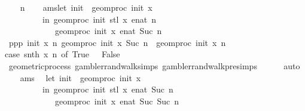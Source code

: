 \begin{isabellebody}
\isanewline
\ \ \isamarkupfalse%
\ n\isanewline
\ \ \isamarkupfalse%
\ ams{\isacharcolon}{\kern0pt}{\isachardoublequoteopen}let\ init{\isacharprime}{\kern0pt}\ {\isacharequal}{\kern0pt}\ geom{\isacharunderscore}{\kern0pt}proc\ init\ x\ {}\isanewline
\ \ \ \ \ \ \ \ \ in\ geom{\isacharunderscore}{\kern0pt}proc\ init{\isacharprime}{\kern0pt}\ {\isacharparenleft}{\kern0pt}stl\ x{\isacharparenright}{\kern0pt}\ {\isacharparenleft}{\kern0pt}enat\ n{\isacharparenright}{\kern0pt}\ {\isacharequal}{\kern0pt}\isanewline
\ \ \ \ \ \ \ \ \ \ \ \ geom{\isacharunderscore}{\kern0pt}proc\ init\ x\ {\isacharparenleft}{\kern0pt}enat\ {\isacharparenleft}{\kern0pt}Suc\ n{\isacharparenright}{\kern0pt}{\isacharparenright}{\kern0pt}{\isachardoublequoteclose}\isanewline
\ \ \isamarkupfalse%
\ ppp{}{\isacharcolon}{\kern0pt}{\isachardoublequoteopen}{\isasymAnd}\ init{}\ x{}\ n{\isachardot}{\kern0pt}\ geom{\isacharunderscore}{\kern0pt}proc\ init{}\ x{}\ {\isacharparenleft}{\kern0pt}Suc\ n{\isacharparenright}{\kern0pt}\ {\isacharequal}{\kern0pt}\ geom{\isacharunderscore}{\kern0pt}proc\ init{}\ x{}\ n\ {\isacharplus}{\kern0pt}\ \isanewline
{\isacharparenleft}{\kern0pt}case\ snth\ x{}\ n\ of\ True\ {\isasymRightarrow}\ {}{\isacharbar}{\kern0pt}\ False\ {\isasymRightarrow}\ {\isacharminus}{\kern0pt}{}{\isacharparenright}{\kern0pt}{\isachardoublequoteclose}\isanewline
\ \ \ \ \isamarkupfalse%
\ geometric{\isacharunderscore}{\kern0pt}process\ gambler{\isacharunderscore}{\kern0pt}rand{\isacharunderscore}{\kern0pt}walk{\isachardot}{\kern0pt}simps\ gambler{\isacharunderscore}{\kern0pt}rand{\isacharunderscore}{\kern0pt}walk{\isacharunderscore}{\kern0pt}pre{\isachardot}{\kern0pt}simps\isanewline
\ \ \ \ \isamarkupfalse%
\ auto\isanewline
\ \ \isamarkupfalse%
\ ams\ \isamarkupfalse%
\ {\isachardoublequoteopen}let\ init{\isacharprime}{\kern0pt}\ {\isacharequal}{\kern0pt}\ geom{\isacharunderscore}{\kern0pt}proc\ init\ x\ {}\isanewline
\ \ \ \ \ \ \ \ \ in\ geom{\isacharunderscore}{\kern0pt}proc\ init{\isacharprime}{\kern0pt}\ {\isacharparenleft}{\kern0pt}stl\ x{\isacharparenright}{\kern0pt}\ {\isacharparenleft}{\kern0pt}enat\ {\isacharparenleft}{\kern0pt}Suc\ n{\isacharparenright}{\kern0pt}{\isacharparenright}{\kern0pt}\ {\isacharequal}{\kern0pt}\isanewline
\ \ \ \ \ \ \ \ \ \ \ \ geom{\isacharunderscore}{\kern0pt}proc\ init\ x\ {\isacharparenleft}{\kern0pt}enat\ {\isacharparenleft}{\kern0pt}Suc\ {\isacharparenleft}{\kern0pt}Suc\ n{\isacharparenright}{\kern0pt}{\isacharparenright}{\kern0pt}{\isacharparenright}{\kern0pt}{\isachardoublequoteclose}\isanewline

\end{isabellebody}
